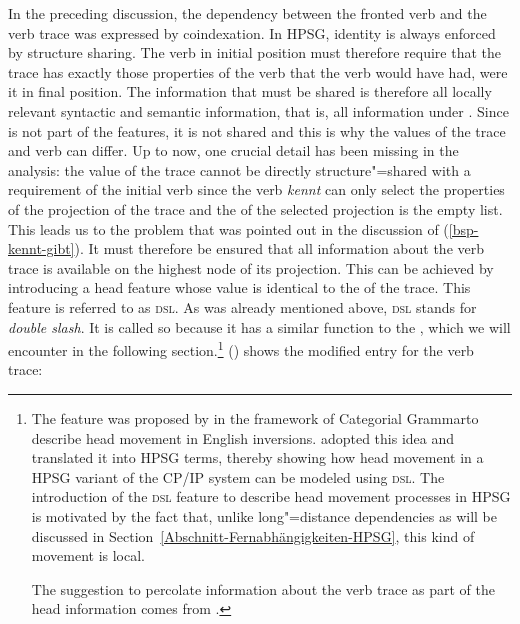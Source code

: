 \noindent
In the preceding discussion, the dependency between the fronted verb and the verb trace was expressed by coindexation. In HPSG, identity is always
enforced by structure sharing. The verb in initial position must therefore require that the trace
has exactly those properties of the verb that the verb would have had, were it in final
position. The information that must be shared is therefore all locally relevant syntactic and
semantic information, that is, all information under \local. Since \phon is not part of the \local features, it is not shared and this is why the \phon values of the trace and verb can
differ. Up to now, one crucial detail has been missing in the analysis: the \local value of the
trace cannot be directly structure"=shared with a requirement of the initial verb since the verb
\emph{kennt} can only select the properties of the projection of the trace and the \compsl of the
selected projection is the empty list. This leads us to the problem that was pointed out in the
discussion of (\ref{bsp-kennt-gibt}). It must therefore be ensured that all information about the verb trace is available
on the highest node of its projection. This can be achieved by introducing a head feature whose
value is identical to the \localv of the trace. This feature is referred to as
\textsc{dsl}. As was already mentioned above, \textsc{dsl} stands for \emph{double
  slash}. It is called so because it has a similar function to the \slashf, which we will encounter in the following section.\footnote{%
	The feature \dsl was proposed by \citet*{Jacobson87} in the framework of Categorial Grammar\indexcg to describe head movement in English
	inversions. \citet{Borsley89} adopted this idea and translated it into HPSG terms, thereby showing how head movement
	in a HPSG variant of the CP/IP system can be modeled using \textsc{dsl}.
	The introduction of the \textsc{dsl} feature to describe head movement processes in HPSG is
        motivated by the fact that, unlike long"=distance dependencies as will be discussed in Section~\ref{Abschnitt-Fernabhängigkeiten-HPSG}, this kind of movement is local.
	
	The suggestion to percolate information about the verb trace as part of the head information comes from \citet{Oliva92a}.%
}
() shows the modified entry for the verb trace:

